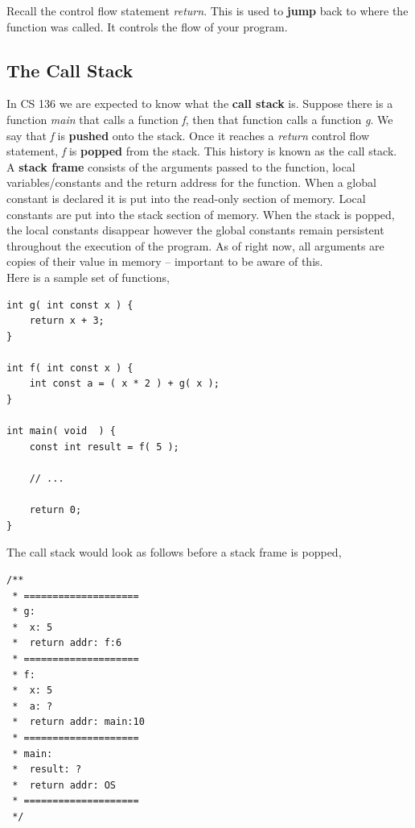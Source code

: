 \documentclass[12pt,extarticle]{article}
\begin{document}
Recall the control flow statement \emph{return}. This is used to \textbf{jump} back to where the function was called. It controls the flow of your program.

\subsection{The Call Stack}

In CS 136 we are expected to know what the \textbf{call stack} is. Suppose there is a function \textit{main} that calls a function \textit{f}, then that function calls a function \textit{g}. We say that \textit{f} is \textbf{pushed} onto the stack. Once it reaches a \textit{return} control flow statement, \textit{f} is \textbf{popped} from the stack. This history is known as the call stack.\\

A \textbf{stack frame} consists of the arguments passed to the function, local variables/constants and the return address for the function. When a global constant is declared it is put into the read-only section of memory. Local constants are put into the stack section of memory. When the stack is popped, the local constants disappear however the global constants remain persistent throughout the execution of the program. As of right now, all arguments are copies of their value in memory -- important to be aware of this.\\

Here is a sample set of functions,\\

\lstset {
	language=c
}
\begin{lstlisting}
int g( int const x ) {
	return x + 3;
}

int f( int const x ) {
	int const a = ( x * 2 ) + g( x );
}

int main( void  ) {
	const int result = f( 5 );
	
	// ...
	
	return 0;
}
\end{lstlisting}

The call stack would look as follows before a stack frame is popped,\\

\lstset {
	language=c
}
\begin{lstlisting}
/**
 * ====================
 * g:
 * 	x: 5
 * 	return addr: f:6
 * ====================
 * f:
 * 	x: 5
 * 	a: ?
 * 	return addr: main:10
 * ====================
 * main:
 * 	result: ?
 * 	return addr: OS
 * ====================
 */
\end{lstlisting}
\end{document}
